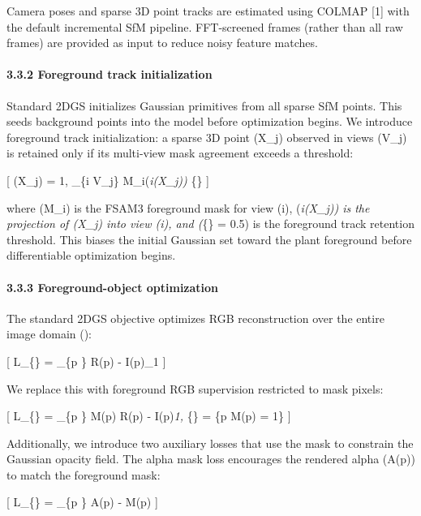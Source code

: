 \documentclass[11pt,a4paper]{article}
\begin{document}
Camera poses and sparse 3D point tracks are estimated using COLMAP
{[}1{]} with the default incremental SfM pipeline. FFT-screened frames
(rather than all raw frames) are provided as input to reduce noisy
feature matches.

\paragraph{3.3.2 Foreground track
initialization}\label{foreground-track-initialization}

Standard 2DGS initializes Gaussian primitives from all sparse SfM
points. This seeds background points into the model before optimization
begins. We introduce foreground track initialization: a sparse 3D point
(X\_j) observed in views (V\_j) is retained only if its multi-view mask
agreement exceeds a threshold:

{[} (X\_j) = 1, \quad {} \quad {}
\sum\_\{i \in V\_j\} M\_i(\pi\emph{i(X\_j)) \geq \tau}\{\}
{]}

where (M\_i) is the FSAM3 foreground mask for view (i),
(\pi\emph{i(X\_j)) is the projection of (X\_j) into view (i), and
(\tau}\{\} = 0.5) is the foreground track retention
threshold. This biases the initial Gaussian set toward the plant
foreground before differentiable optimization begins.

\paragraph{3.3.3 Foreground-object
optimization}\label{foreground-object-optimization}

The standard 2DGS objective optimizes RGB reconstruction over the entire
image domain (\Omega):

{[} L\_\{\} =  \sum\_\{p \in \Omega\}
\textbar R(p) - I(p)\textbar\_1 {]}

We replace this with foreground RGB supervision restricted to mask
pixels:

{[} L\_\{\} =  \sum\_\{p
\in \Omega\} M(p) \textbar R(p) - I(p)\textbar{}\emph{1,
\quad \Omega}\{\} = \{p \mid M(p) = 1\} {]}

Additionally, we introduce two auxiliary losses that use the mask to
constrain the Gaussian opacity field. The alpha mask loss encourages the
rendered alpha (A(p)) to match the foreground mask:

{[} L\_\{\} =  \sum\_\{p \in \Omega\}
\textbar A(p) - M(p)\textbar{} {]}
\end{document}

